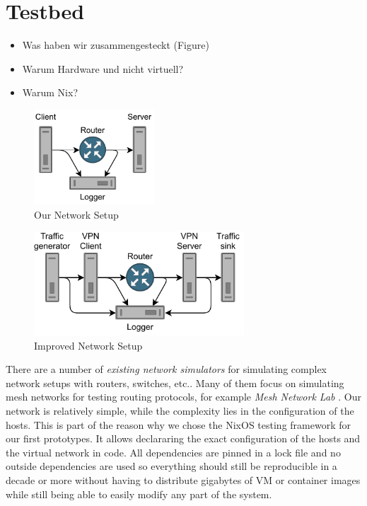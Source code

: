\section{Testbed}
\begin{itemize}
  \item Was haben wir zusammengesteckt (Figure)
  \item Warum Hardware und nicht virtuell?
  \item Warum Nix?
\end{itemize}
\begin{figure}[tbh]
	\centering
	\includegraphics[draft=false,width=0.4\textwidth]{figures/Network schematic/actual/setup.pdf}
	\caption{Our Network Setup}\label{fig:actual_network_schematic}
\end{figure}
\begin{figure}[tbh]
	\centering
	\includegraphics[draft=false,width=0.7\textwidth]{figures/Network schematic/optimal/setup.pdf}
	\caption{Improved Network Setup}\label{fig:optimal_network_schematic}
\end{figure}
There are a number of \textit{existing network simulators} \cite{network-simulators-list} for simulating complex network setups with routers, switches, etc..
Many of them focus on simulating mesh networks for testing routing protocols, for example \textit{Mesh Network Lab} \cite{meshnet-lab}.
Our network is relatively simple, while the complexity lies in the configuration of the hosts.
This is part of the reason why we chose the NixOS testing framework for our first prototypes.
It allows declararing the exact configuration of the hosts and the virtual network in code.
All dependencies are pinned in a lock file and no outside dependencies are used so everything should still be reproducible in a decade or more without having to distribute gigabytes of VM or container images while still being able to easily modify any part of the system.

